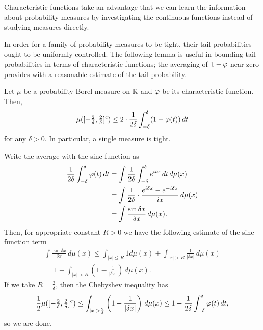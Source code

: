 \documentclass[12pt]{article}
\begin{document}
Characteristic functions take an advantage that we can learn the information about probability measures by investigating the continuous functions instead of studying measures directly.



\begin{defn}

\end{defn}

In order for a family of probability measures to be tight, their tail probabilities ought to be uniformly controlled.
The following lemma is useful in bounding tail probabilities in terms of characteristic functions; the averaging of $1-\varphi$ near zero provides with a reasonable estimate of the tail probability.

\begin{lem}
Let $\mu$ be a probability Borel measure on $\mathbb{R}$ and $\varphi$ be its characteristic function.
Then,
\[\mu([-\tfrac2\delta,\tfrac2\delta]^c)\le2\cdot\frac1{2\delta}\int_{-\delta}^\delta(1-\varphi(t))\,dt\]
for any $\delta>0$.
In particular, a single measure is tight.
\end{lem}
\begin{pf}
Write the average with the sinc function as
\begin{align*}
\frac1{2\delta}\int_{-\delta}^\delta\varphi(t)\,dt
&=\int\frac1{2\delta}\int_{-\delta}^\delta e^{itx}\,dt\,d\mu(x)\\
&=\int\frac1{2\delta}\cdot\frac{e^{i\delta x}-e^{-i\delta x}}{ix}\,d\mu(x)\\
&=\int\frac{\sin\delta x}{\delta x}\,d\mu(x).
\end{align*}
Then, for appropriate constant $R>0$ we have the following estimate of the sinc function term
\begin{align*}
\int\frac{\sin\delta x}{\delta x}\,d\mu(x)
\le\int_{|x|\le R}1d\mu(x)+\int_{|x|>R}\frac1{|\delta x|}\,d\mu(x)\\
=1-\int_{|x|>R}\left(1-\frac1{|\delta x|}\right)\,d\mu(x).
\end{align*}
If we take $R=\frac2\delta$, then the Chebyshev inequality has
\[\frac12\mu([-\tfrac2\delta,\tfrac2\delta]^c)\le\int_{|x|>\frac2\delta}\left(1-\frac1{|\delta x|}\right)\,d\mu(x)\le1-\frac1{2\delta}\int_{-\delta}^\delta\f(t)\,dt,\]
so we are done.
\end{pf}
\end{document}
